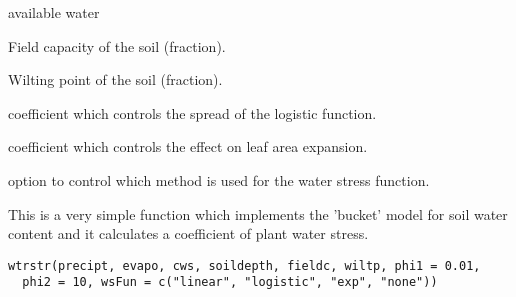 \documentclass[letterpaper]{book}
\begin{document}
%
\begin{Arguments}
\begin{ldescription}
\item[\code{aw}] available water

\item[\code{fieldc}] Field capacity of the soil (fraction).

\item[\code{wiltp}] Wilting point of the soil (fraction).

\item[\code{phi1}] coefficient which controls the spread of the
logistic function.

\item[\code{phi2}] coefficient which controls the effect on leaf
area expansion.

\item[\code{wsFun}] option to control which method is used for
the water stress function.
\end{ldescription}
\end{Arguments}
%
\begin{Description}\relax
This is a very simple function which implements the
'bucket' model for soil water content and it calculates a
coefficient of plant water stress.
\end{Description}
%
\begin{Usage}
\begin{verbatim}
wtrstr(precipt, evapo, cws, soildepth, fieldc, wiltp, phi1 = 0.01,
  phi2 = 10, wsFun = c("linear", "logistic", "exp", "none"))
\end{verbatim}
\end{Usage}
%
\end{document}
